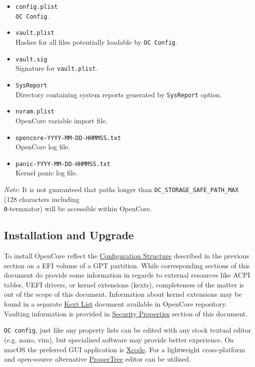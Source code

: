 \documentclass[]{article}
\begin{document}
\begin{itemize}
\item
  \texttt{config.plist} \\
  \texttt{OC Config}.
\item
  \texttt{vault.plist} \\
  Hashes for all files potentially loadable by \texttt{OC Config}.
\item
  \texttt{vault.sig} \\
  Signature for \texttt{vault.plist}.
\item
  \texttt{SysReport} \\
  Directory containing system reports generated by \texttt{SysReport} option.
\item
  \texttt{nvram.plist} \\
  OpenCore variable import file.
\item
  \texttt{opencore-YYYY-MM-DD-HHMMSS.txt} \\
  OpenCore log file.
\item
  \texttt{panic-YYYY-MM-DD-HHMMSS.txt} \\
  Kernel panic log file.
\end{itemize}

\emph{Note}: It is not guaranteed that paths longer than
\texttt{OC\_STORAGE\_SAFE\_PATH\_MAX} (128 characters including
\texttt{\\0}-termnator) will be accessible within OpenCore.

\subsection{Installation and Upgrade}\label{configuration-install}

To install OpenCore reflect the
\hyperref[configuration-structure]{Configuration Structure} described
in the previous section on a EFI volume of a GPT partition. While
corresponding sections of this document do provide some information
in regards to external resources like ACPI tables, UEFI drivers,
or kernel extensions (kexts), completeness of the matter is out of
the scope of this document. Information about kernel extensions may
be found in a separate
\href{https://github.com/acidanthera/OpenCorePkg/blob/master/Docs/Kexts.md}{Kext List}
document available in OpenCore repository. Vaulting information is provided in
\hyperref[miscsecurityprops]{Security Properties} section of this document.

\texttt{OC\ config}, just like any property lists can be edited with any
stock textual editor (e.g. nano, vim), but specialised software may provide
better experience. On macOS the preferred GUI application is
\href{https://developer.apple.com/xcode}{Xcode}. For a lightweight
cross-platform and open-source alternative
\href{https://github.com/corpnewt/ProperTree}{ProperTree} editor can be
utilised.
\end{document}
